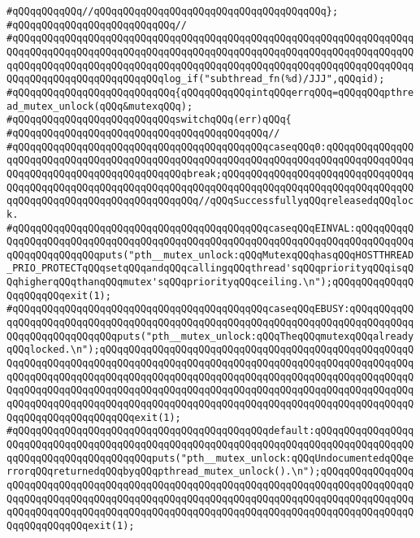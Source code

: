\verb|#qQQqqQQqqQQq//qQQqqQQqqQQqqQQqqQQqqQQqqQQqqQQqqQQqqQQq};|\newline
\verb|#qQQqqQQqqQQqqQQqqQQqqQQqqQQq//|\newline
\verb|#qQQqqQQqqQQqqQQqqQQqqQQqqQQqqQQqqQQqqQQqqQQqqQQqqQQqqQQqqQQqqQQqqQQqqQQqqQQqqQQqqQQqqQQqqQQqqQQqqQQqqQQqqQQqqQQqqQQqqQQqqQQqqQQqqQQqqQQqqQQqqQQqqQQqqQQqqQQqqQQqqQQqqQQqqQQqqQQqqQQqqQQqqQQqqQQqqQQqqQQqqQQqqQQqqQQqqQQqqQQqqQQqqQQqqQQqqQQqlog_if("subthread_fn(%d)/JJJ",qQQqid);|\newline
\verb|#qQQqqQQqqQQqqQQqqQQqqQQqqQQq{qQQqqQQqqQQqintqQQqerrqQQq=qQQqqQQqpthread_mutex_unlock(qQQq&mutexqQQq);|\newline
\verb|#qQQqqQQqqQQqqQQqqQQqqQQqqQQqswitchqQQq(err)qQQq{|\newline
\verb|#qQQqqQQqqQQqqQQqqQQqqQQqqQQqqQQqqQQqqQQqqQQq//|\newline
\verb|#qQQqqQQqqQQqqQQqqQQqqQQqqQQqqQQqqQQqqQQqqQQqcaseqQQq0:qQQqqQQqqQQqqQQqqQQqqQQqqQQqqQQqqQQqqQQqqQQqqQQqqQQqqQQqqQQqqQQqqQQqqQQqqQQqqQQqqQQqqQQqqQQqqQQqqQQqqQQqqQQqqQQqqQQqbreak;qQQqqQQqqQQqqQQqqQQqqQQqqQQqqQQqqQQqqQQqqQQqqQQqqQQqqQQqqQQqqQQqqQQqqQQqqQQqqQQqqQQqqQQqqQQqqQQqqQQqqQQqqQQqqQQqqQQqqQQqqQQqqQQqqQQqqQQq//qQQqSuccessfullyqQQqreleasedqQQqlock.|\newline
\verb|#qQQqqQQqqQQqqQQqqQQqqQQqqQQqqQQqqQQqqQQqqQQqcaseqQQqEINVAL:qQQqqQQqqQQqqQQqqQQqqQQqqQQqqQQqqQQqqQQqqQQqqQQqqQQqqQQqqQQqqQQqqQQqqQQqqQQqqQQqqQQqqQQqqQQqqQQqputs("pth__mutex_unlock:qQQqMutexqQQqhasqQQqHOSTTHREAD_PRIO_PROTECTqQQqsetqQQqandqQQqcallingqQQqthread'sqQQqpriorityqQQqisqQQqhigherqQQqthanqQQqmutex'sqQQqpriorityqQQqceiling.\n");qQQqqQQqqQQqqQQqqQQqqQQqexit(1);|\newline
\verb|#qQQqqQQqqQQqqQQqqQQqqQQqqQQqqQQqqQQqqQQqqQQqcaseqQQqEBUSY:qQQqqQQqqQQqqQQqqQQqqQQqqQQqqQQqqQQqqQQqqQQqqQQqqQQqqQQqqQQqqQQqqQQqqQQqqQQqqQQqqQQqqQQqqQQqqQQqqQQqputs("pth__mutex_unlock:qQQqTheqQQqmutexqQQqalreadyqQQqlocked.\n");qQQqqQQqqQQqqQQqqQQqqQQqqQQqqQQqqQQqqQQqqQQqqQQqqQQqqQQqqQQqqQQqqQQqqQQqqQQqqQQqqQQqqQQqqQQqqQQqqQQqqQQqqQQqqQQqqQQqqQQqqQQqqQQqqQQqqQQqqQQqqQQqqQQqqQQqqQQqqQQqqQQqqQQqqQQqqQQqqQQqqQQqqQQqqQQqqQQqqQQqqQQqqQQqqQQqqQQqqQQqqQQqqQQqqQQqqQQqqQQqqQQqqQQqqQQqqQQqqQQqqQQqqQQqqQQqqQQqqQQqqQQqqQQqqQQqqQQqqQQqqQQqqQQqqQQqqQQqqQQqqQQqqQQqqQQqqQQqqQQqqQQqqQQqqQQqqQQqexit(1);|\newline
\verb|#qQQqqQQqqQQqqQQqqQQqqQQqqQQqqQQqqQQqqQQqqQQqdefault:qQQqqQQqqQQqqQQqqQQqqQQqqQQqqQQqqQQqqQQqqQQqqQQqqQQqqQQqqQQqqQQqqQQqqQQqqQQqqQQqqQQqqQQqqQQqqQQqqQQqqQQqqQQqqQQqputs("pth__mutex_unlock:qQQqUndocumentedqQQqerrorqQQqreturnedqQQqbyqQQqpthread_mutex_unlock().\n");qQQqqQQqqQQqqQQqqQQqqQQqqQQqqQQqqQQqqQQqqQQqqQQqqQQqqQQqqQQqqQQqqQQqqQQqqQQqqQQqqQQqqQQqqQQqqQQqqQQqqQQqqQQqqQQqqQQqqQQqqQQqqQQqqQQqqQQqqQQqqQQqqQQqqQQqqQQqqQQqqQQqqQQqqQQqqQQqqQQqqQQqqQQqqQQqqQQqqQQqqQQqqQQqqQQqqQQqqQQqqQQqqQQqqQQqqQQqqQQqexit(1);|\newline
